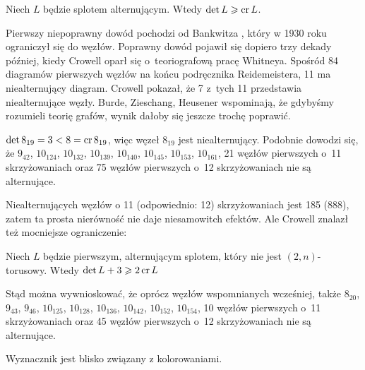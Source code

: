 
\begin{proposition}
%
\label{prp:bankwitz}%
    Niech $L$ będzie splotem alternującym.
    Wtedy $\det L \geqslant \operatorname{cr} L$.
\end{proposition}

Pierwszy niepoprawny dowód pochodzi od Bankwitza \cite{bankwitz30}, który w 1930 roku ograniczył się do węzłów.
%
Poprawny dowód pojawił się dopiero trzy dekady później, kiedy Crowell \cite{crowell59} oparł się o~teoriografową pracę Whitneya.
%
%
Spośród 84 diagramów pierwszych węzłów na końcu podręcznika Reidemeistera, 11 ma niealternujący diagram.
Crowell pokazał, że 7 z~tych 11 przedstawia niealternujące węzły.
Burde, Zieschang, Heusener \cite[s. 265]{burde14} wspominają, że gdybyśmy rozumieli teorię grafów, wynik dałoby się jeszcze trochę poprawić.

\begin{example}
    $\det 8_{19} = 3 < 8 = \operatorname{cr} 8_{19}$, więc węzeł $8_{19}$ jest niealternujący.
    Podobnie dowodzi się, że $9_{42}$, $10_{124}$, $10_{132}$, $10_{139}$, $10_{140}$, $10_{145}$, $10_{153}$, $10_{161}$, 21 węzłów pierwszych o~11 skrzyżowaniach oraz 75 węzłów pierwszych o~12 skrzyżowaniach nie są alternujące.
\end{example}

Niealternujących węzłów o 11 (odpowiednio: 12) skrzyżowaniach jest 185 (888), zatem ta prosta nierówność nie daje niesamowitch efektów.
Ale Crowell znalazł też mocniejsze ograniczenie:

\begin{proposition}
    Niech $L$ będzie pierwszym, alternującym splotem, który nie jest $(2, n)$-torusowy.
    Wtedy $\det L + 3 \geqslant 2 \operatorname{cr} L$
\end{proposition}

Stąd można wywnioskować, że oprócz węzłów wspomnianych wcześniej, także $8_{20}$, 
$9_{43}$, $9_{46}$, $10_{125}$, $10_{128}$, $10_{136}$, $10_{142}$, $10_{152}$, $10_{154}$, 10 węzłów pierwszych o~11 skrzyżowaniach oraz 45 węzłów pierwszych o~12 skrzyżowaniach nie są alternujące.

Wyznacznik jest blisko związany z kolorowaniami.

